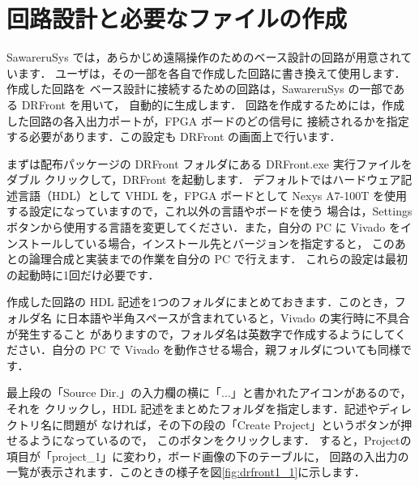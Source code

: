 \section{回路設計と必要なファイルの作成}

SawareruSys では，あらかじめ遠隔操作のためのベース設計の回路が用意されています．
ユーザは，その一部を各自で作成した回路に書き換えて使用します．作成した回路を
ベース設計に接続するための回路は，SawareruSys の一部である DRFront を用いて，
自動的に生成します．
回路を作成するためには，作成した回路の各入出力ポートが，FPGA ボードのどの信号に
接続されるかを指定する必要があります．この設定も DRFront の画面上で行います．

まずは配布パッケージの DRFront フォルダにある DRFront.exe 実行ファイルをダブル
クリックして，DRFront を起動します．
デフォルトではハードウェア記述言語（HDL）として VHDL を，FPGA ボードとして
Nexys A7-100T を使用する設定になっていますので，これ以外の言語やボードを使う
場合は，Settings ボタンから使用する言語を変更してください．また，自分の PC に
Vivado をインストールしている場合，インストール先とバージョンを指定すると，
このあとの論理合成と実装までの作業を自分の PC で行えます．
これらの設定は最初の起動時に1回だけ必要です．

作成した回路の HDL 記述を1つのフォルダにまとめておきます．このとき，フォルダ名
に日本語や半角スペースが含まれていると，Vivado の実行時に不具合が発生すること
がありますので，フォルダ名は英数字で作成するようにしてください．自分の PC で
Vivado を動作させる場合，親フォルダについても同様です．

最上段の「Source Dir.」の入力欄の横に「...」と書かれたアイコンがあるので，それを
クリックし，HDL 記述をまとめたフォルダを指定します．記述やディレクトリ名に問題が
なければ，その下の段の「Create Project」というボタンが押せるようになっているので，
このボタンをクリックします．
すると，Projectの項目が「project\_1」に変わり，ボード画像の下のテーブルに，
回路の入出力の一覧が表示されます．このときの様子を図\ref{fig:drfront1_1}に示します．

